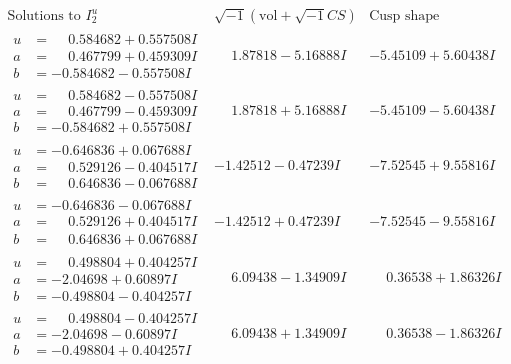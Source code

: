 \documentclass[1p]{elsarticle_modified}
\theoremstyle{definition}
\newcommand{\I}{\sqrt{-1}}
\begin{document}
$$\begin{array}{c|c|c}  
\text{Solutions to }I^u_{2}& \I (\text{vol} + \sqrt{-1}CS) & \text{Cusp shape}\\
 \hline 
\begin{aligned}
u &= \phantom{-}0.584682 + 0.557508 I \\
a &= \phantom{-}0.467799 + 0.459309 I \\
b &= -0.584682 - 0.557508 I\end{aligned}
 & \phantom{-}1.87818 - 5.16888 I & -5.45109 + 5.60438 I \\ \hline\begin{aligned}
u &= \phantom{-}0.584682 - 0.557508 I \\
a &= \phantom{-}0.467799 - 0.459309 I \\
b &= -0.584682 + 0.557508 I\end{aligned}
 & \phantom{-}1.87818 + 5.16888 I & -5.45109 - 5.60438 I \\ \hline\begin{aligned}
u &= -0.646836 + 0.067688 I \\
a &= \phantom{-}0.529126 - 0.404517 I \\
b &= \phantom{-}0.646836 - 0.067688 I\end{aligned}
 & -1.42512 - 0.47239 I & -7.52545 + 9.55816 I \\ \hline\begin{aligned}
u &= -0.646836 - 0.067688 I \\
a &= \phantom{-}0.529126 + 0.404517 I \\
b &= \phantom{-}0.646836 + 0.067688 I\end{aligned}
 & -1.42512 + 0.47239 I & -7.52545 - 9.55816 I \\ \hline\begin{aligned}
u &= \phantom{-}0.498804 + 0.404257 I \\
a &= -2.04698 + 0.60897 I \\
b &= -0.498804 - 0.404257 I\end{aligned}
 & \phantom{-}6.09438 - 1.34909 I & \phantom{-}0.36538 + 1.86326 I \\ \hline\begin{aligned}
u &= \phantom{-}0.498804 - 0.404257 I \\
a &= -2.04698 - 0.60897 I \\
b &= -0.498804 + 0.404257 I\end{aligned}
 & \phantom{-}6.09438 + 1.34909 I & \phantom{-}0.36538 - 1.86326 I \\ \hline\begin{aligned}

\end{aligned}
\end{array}$$
\end{document}
